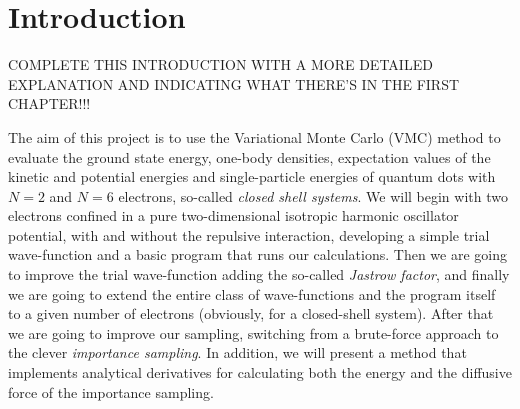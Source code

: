 \chapter{Introduction}
COMPLETE THIS INTRODUCTION WITH A MORE DETAILED EXPLANATION AND INDICATING WHAT THERE'S IN THE FIRST CHAPTER!!!

The aim of this project is to use the Variational Monte Carlo (VMC) 
method to evaluate the ground state energy, one-body densities, 
expectation values of the kinetic and potential energies and 
single-particle energies of quantum dots with $N = 2$ and $N = 6$ 
electrons, so-called \emph{closed shell systems}. We will begin with 
two electrons confined in a pure two-dimensional isotropic harmonic 
oscillator potential, with and without the repulsive interaction, developing
a simple trial wave-function and a basic program that runs our calculations.
Then we are going to improve the trial wave-function adding the so-called 
\emph{Jastrow factor}, and finally we are going to extend the entire class of
wave-functions and the program itself to a given number of electrons 
(obviously, for a closed-shell system). After that we are going to improve
our sampling, switching from a brute-force approach to the clever
\emph{importance sampling}. In addition, we will present a method that 
implements analytical derivatives for calculating both the energy and the
diffusive force of the importance sampling.			
